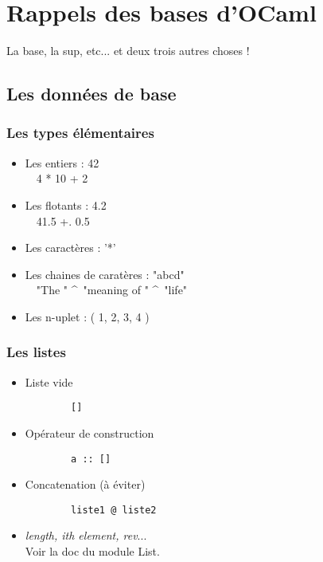 \section{Rappels des bases d'OCaml}
\begin{frame}
  \begin{center}
	\huge
	La base, la sup, etc... et deux trois autres choses !
  \end{center}
\end{frame}

\subsection{Les données de base} %
\begin{frame}[fragile]
	\frametitle{Les types élémentaires}
	\begin{itemize}
		\item Les entiers : 42\\
			~~4 * 10 + 2
		\item Les flotants : 4.2\\
			~~41.5 +. 0.5
		\item Les caractères : '*'\\
		\item Les chaines de caratères : "abcd"\\
			~~"The " \^~"meaning of " \^~"life"
			\item Les n-uplet : ( 1, 2, 3, 4 )
	\end{itemize}
\end{frame}

\begin{frame}[fragile]
	\frametitle{Les listes}
	\begin{itemize}

	\item Liste vide
		\begin{lstlisting}
		[]
		\end{lstlisting}

	\item Opérateur de construction
		\begin{lstlisting}
		a :: []
		\end{lstlisting}

	\item Concatenation (à éviter)
		\begin{lstlisting}
		liste1 @ liste2
		\end{lstlisting}
		
	\item \textit{length, ith element, rev}...\\
	  Voir la doc du module List.

	\end{itemize}
\end{frame}

